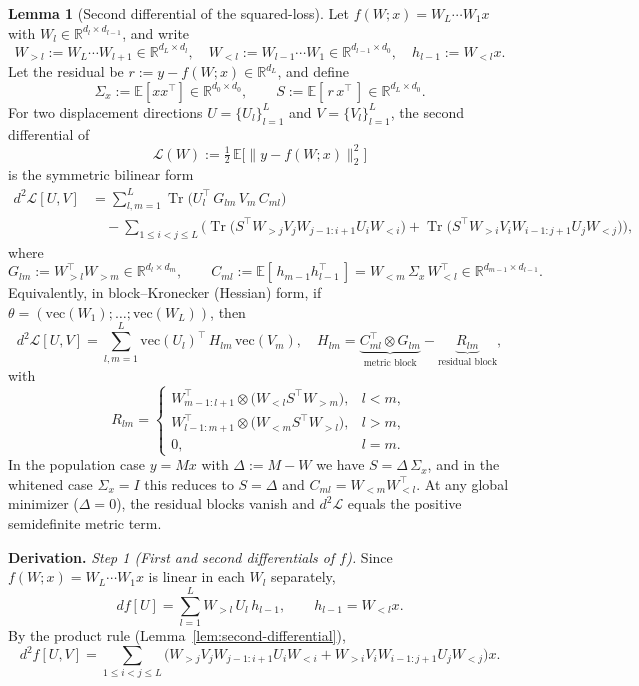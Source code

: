 \documentclass{article}
\theoremstyle{definition}
\newtheorem{lemma}[theorem]{Lemma}
\begin{document}
\begin{lemma}[Second differential of the squared-loss]\label{lem:d2L-correct}
Let $f(W;x)=W_L\cdots W_1x$ with $W_l\in\mathbb{R}^{d_l\times d_{l-1}}$, and write
\[
W_{>l}:=W_L\cdots W_{l+1}\in\mathbb{R}^{d_L\times d_l},
\quad
W_{<l}:=W_{l-1}\cdots W_{1}\in\mathbb{R}^{d_{l-1}\times d_0},
\quad
h_{l-1}:=W_{<l}x.
\]
Let the residual be $r:=y-f(W;x)\in\mathbb{R}^{d_L}$, and define
\[
\Sigma_x:=\mathbb{E}[xx^\top]\in\mathbb{R}^{d_0\times d_0},
\qquad
S:=\mathbb{E}[\,r\,x^\top\,]\in\mathbb{R}^{d_L\times d_0}.
\]
For two displacement directions $U=\{U_l\}_{l=1}^L$ and $V=\{V_l\}_{l=1}^L$, the second differential of
\[
\mathcal{L}(W):=\tfrac12\,\mathbb{E}\big[\|y-f(W;x)\|_2^2\big]
\]
is the symmetric bilinear form
\[
\boxed{
\begin{aligned}
d^2\mathcal{L}[U,V]
&=\sum_{l,m=1}^L \operatorname{Tr}\!\big(U_l^\top\,G_{lm}\,V_m\,C_{ml}\big)\\
&\quad-\sum_{1\le i<j\le L}\!\Big(
\operatorname{Tr}\!\big(S^\top W_{>j}V_jW_{j-1:i+1}U_iW_{<i}\big)
+\operatorname{Tr}\!\big(S^\top W_{>i}V_iW_{i-1:j+1}U_jW_{<j}\big)
\Big),
\end{aligned}}
\]
where
\[
G_{lm}:=W_{>l}^\top W_{>m}\in\mathbb{R}^{d_l\times d_m},
\qquad
C_{ml}:=\mathbb{E}[\,h_{m-1}h_{l-1}^\top\,]
= W_{<m}\,\Sigma_x\,W_{<l}^\top\in\mathbb{R}^{d_{m-1}\times d_{l-1}}.
\]
Equivalently, in block–Kronecker (Hessian) form, if $\theta=(\mathrm{vec}(W_1);\dots;\mathrm{vec}(W_L))$, then
\[
d^2\mathcal{L}[U,V]=\sum_{l,m=1}^L \mathrm{vec}(U_l)^\top\,H_{lm}\,\mathrm{vec}(V_m),
\quad
H_{lm}=\underbrace{C_{ml}^\top\!\otimes G_{lm}}_{\text{metric block}}
-\underbrace{R_{lm}}_{\text{residual block}},
\]
with
\[
R_{lm}=
\begin{cases}
W_{m-1:l+1}^\top\!\otimes\big(W_{<l}S^\top W_{>m}\big), & l<m,\\[3pt]
W_{l-1:m+1}^\top\!\otimes\big(W_{<m}S^\top W_{>l}\big), & l>m,\\[3pt]
0, & l=m.
\end{cases}
\]
In the population case $y=Mx$ with $\Delta:=M-W$ we have $S=\Delta\,\Sigma_x$, and in the whitened case $\Sigma_x=I$ this reduces to $S=\Delta$ and $C_{ml}=W_{<m}W_{<l}^\top$. At any global minimizer ($\Delta=0$), the residual blocks vanish and $d^2\mathcal{L}$ equals the positive semidefinite metric term.
\end{lemma}

\noindent\textbf{Derivation.}
\emph{Step 1 (First and second differentials of $f$).}
Since $f(W;x)=W_L\cdots W_1x$ is linear in each $W_l$ separately,
\[
df[U]=\sum_{l=1}^L W_{>l}\,U_l\,h_{l-1},
\qquad
h_{l-1}=W_{<l}x.
\]
By the product rule (Lemma~\ref{lem:second-differential}),
\[
d^2 f[U,V]
=\sum_{1\le i<j\le L}\!\Big(
W_{>j}V_jW_{j-1:i+1}U_iW_{<i}
+
W_{>i}V_iW_{i-1:j+1}U_jW_{<j}
\Big)x.
\tag{$\ast$}
\]
\end{document}
